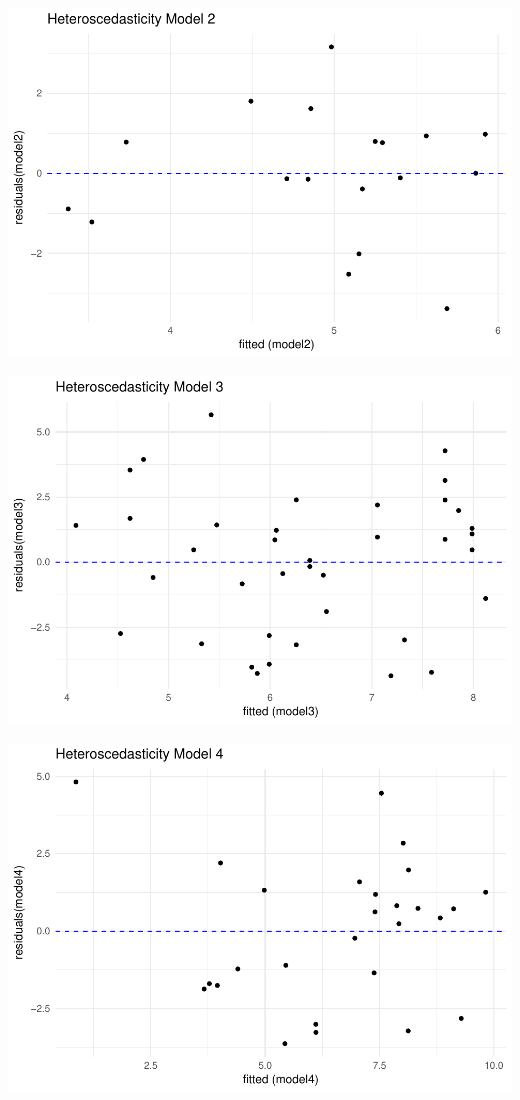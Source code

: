 \documentclass[]{elsarticle} %
\makeatletter
\def\maxwidth{\ifdim\Gin@nat@width>\linewidth\linewidth
\else\Gin@nat@width\fi}
\let\Oldincludegraphics\includegraphics
\renewcommand{\includegraphics}[1]{\Oldincludegraphics[width=\maxwidth]{#1}}
\makeatother
\begin{document}
\includegraphics{refugees-stephanie_files/figure-latex/ggplot_model_2-1.pdf}

\includegraphics{refugees-stephanie_files/figure-latex/ggplot_model_3-1.pdf}

\includegraphics{refugees-stephanie_files/figure-latex/ggplot_model_4-1.pdf}
\end{document}
